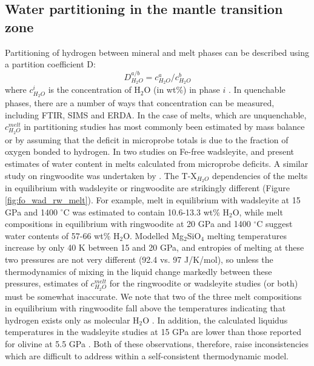 \documentclass[review]{elsarticle}
\begin{document}


\subsection{Water partitioning in the mantle transition zone}

Partitioning of hydrogen between mineral and melt phases can be described using a partition coefficient D:
\begin{equation}
  D^{a/b}_{H_2O} = c^a_{H_2O} / c^b_{H_2O}
\end{equation}
where $c^i_{H_2O}$ is the concentration of H$_2$O (in wt\%) in phase $i$ \citep{KB2006}. In quenchable phases, there are a number of ways that concentration can be measured, including FTIR, SIMS and ERDA. In the case of melts, which are unquenchable, $c^{melt}_{H_2O}$ in partitioning studies has most commonly been estimated by mass balance or by assuming that the deficit in microprobe totals is due to the fraction of oxygen bonded to hydrogen. In two studies on Fe-free wadsleyite, \cite{DDFK2005} and \cite{LSOK2011} present estimates of water content in melts calculated from microprobe deficits. A similar study on ringwoodite was undertaken by \cite{OMY2000}. The T-X$_{H_2O}$ dependencies of the melts in equilibrium with wadsleyite or ringwoodite are strikingly different (Figure \ref{fig:fo_wad_rw_melt}). For example, melt in equilibrium with wadsleyite at 15 GPa and 1400 $^{\circ}$C was estimated to contain 10.6-13.3 wt\% H$_2$O, while melt compositions in equilibrium with ringwoodite at 20 GPa and 1400 $^{\circ}$C suggest water contents of 57-66 wt\% H$_2$O. Modelled Mg$_2$SiO$_4$ melting temperatures increase by only 40 K between 15 and 20 GPa, and entropies of melting at these two pressures are not very different (92.4 vs. 97 J/K/mol), so unless the thermodynamics of mixing in the liquid change markedly between these pressures, estimates of $c^{melt}_{H_2O}$ for the ringwoodite or wadsleyite studies (or both) must be somewhat inaccurate. We note that two of the three melt compositions in equilibrium with ringwoodite fall above the temperatures indicating that hydrogen exists only as molecular H$_2$O \citep{SS1985}. In addition, the calculated liquidus temperatures in the wadsleyite studies at 15 GPa are lower than those reported for olivine at 5.5 GPa \citep{Inoue1994}. Both of these observations, therefore, raise inconsistencies which are difficult to address within a self-consistent thermodynamic model.
\end{document}
